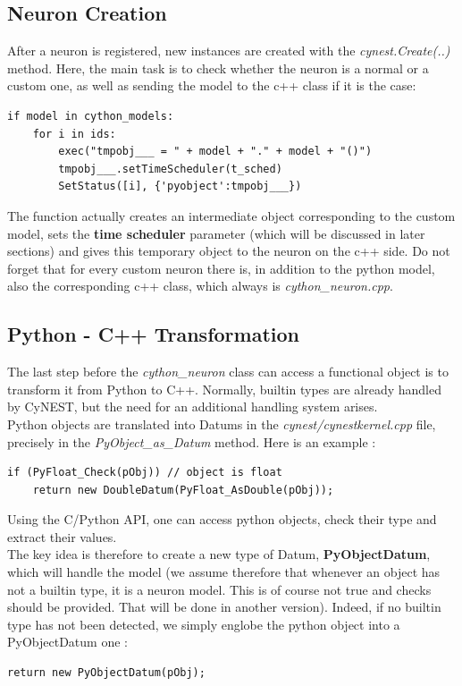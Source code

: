 \documentclass{article}
\begin{document}
\subsection{Neuron Creation}
After a neuron is registered, new instances are created with the \emph{cynest.Create(..)} method.
Here, the main task is to check whether the neuron is a normal or a custom one, as well as sending the model to the c++ class if it is the case:
\begin{verbatim}
if model in cython_models:
    for i in ids:
        exec("tmpobj___ = " + model + "." + model + "()")
        tmpobj___.setTimeScheduler(t_sched)
        SetStatus([i], {'pyobject':tmpobj___})
\end{verbatim}
The function actually creates an intermediate object corresponding to the custom model, sets the \textbf{time scheduler} parameter (which will be discussed in later sections) and gives this temporary object to the neuron on the c++ side. Do not forget that for every custom neuron there is, in addition to the python model, also the corresponding c++ class, which always is \emph{cython\_neuron.cpp}.

\subsection{Python - C++ Transformation}
The last step before the \emph{cython\_neuron} class can access a functional object is to transform it from Python to C++. Normally, builtin types are already handled by CyNEST, but the need for an additional handling system arises. \\
Python objects are translated into Datums in the \emph{cynest/cynestkernel.cpp} file, precisely in the \emph{PyObject\_as\_Datum} method. Here is an example :
\begin{verbatim}
if (PyFloat_Check(pObj)) // object is float
    return new DoubleDatum(PyFloat_AsDouble(pObj));
\end{verbatim}
Using the C/Python API, one can access python objects, check their type and extract their values.\\
The key idea is therefore to create a new type of Datum, \textbf{PyObjectDatum}, which will handle the model (we assume therefore that whenever an object has not a builtin type, it is a neuron model. This is of course not true and checks should be provided. That will be done in another version). Indeed, if no builtin type has not been detected, we simply englobe the python object into a PyObjectDatum one :
\begin{verbatim}
return new PyObjectDatum(pObj);
\end{verbatim}
\end{document}
